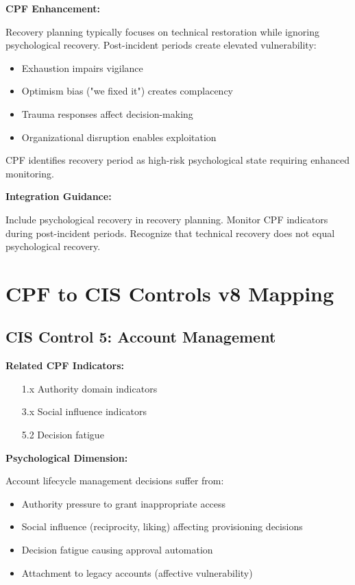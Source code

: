 \documentclass[11pt,a4paper]{article}
\begin{document}
\textbf{CPF Enhancement:}

Recovery planning typically focuses on technical restoration while ignoring psychological recovery. Post-incident periods create elevated vulnerability:

\begin{itemize}
\item Exhaustion impairs vigilance
\item Optimism bias ("we fixed it") creates complacency
\item Trauma responses affect decision-making
\item Organizational disruption enables exploitation
\end{itemize}

CPF identifies recovery period as high-risk psychological state requiring enhanced monitoring.

\textbf{Integration Guidance:}

Include psychological recovery in recovery planning. Monitor CPF indicators during post-incident periods. Recognize that technical recovery does not equal psychological recovery.

\section{CPF to CIS Controls v8 Mapping}

\subsection{CIS Control 5: Account Management}

\textbf{Related CPF Indicators:}
\begin{itemize}
\item [1.x] Authority domain indicators
\item [3.x] Social influence indicators
\item [5.2] Decision fatigue
\end{itemize}

\textbf{Psychological Dimension:}

Account lifecycle management decisions suffer from:

\begin{itemize}
\item Authority pressure to grant inappropriate access
\item Social influence (reciprocity, liking) affecting provisioning decisions
\item Decision fatigue causing approval automation
\item Attachment to legacy accounts (affective vulnerability)
\end{itemize}
\end{document}
